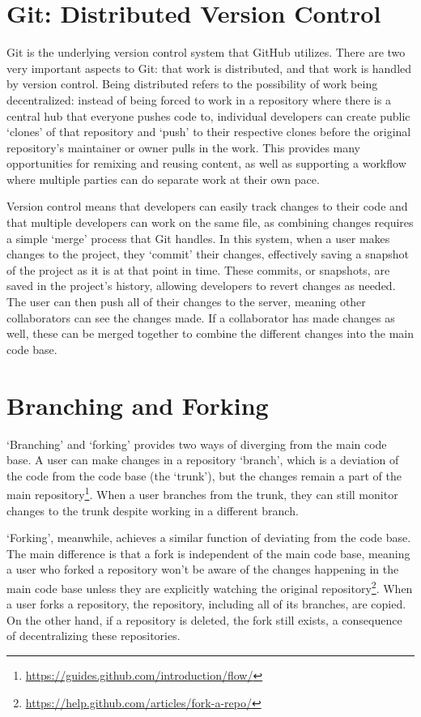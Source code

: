 \section{Git: Distributed Version Control}
Git is the underlying version control system that GitHub utilizes. There are two very important aspects to Git: that work is distributed, and that work is handled by version control. Being distributed refers to the possibility of work being decentralized: instead of being forced to work in a repository where there is a central hub that everyone pushes code to, individual developers can create public `clones' of that repository and `push' to their respective clones before the original repository's maintainer or owner pulls in the work. This provides many opportunities for remixing and reusing content, as well as supporting a workflow where multiple parties can do separate work at their own pace.

Version control means that developers can easily track changes to their code and that multiple developers can work on the same file, as combining changes requires a simple `merge' process that Git handles. In this system, when a user makes changes to the project, they `commit' their changes, effectively saving a snapshot of the project as it is at that point in time. These commits, or snapshots, are saved in the project's history, allowing developers to revert changes as needed. The user can then push all of their changes to the server, meaning other collaborators can see the changes made. If a collaborator has made changes as well, these can be merged together to combine the different changes into the main code base.

\section{Branching and Forking}
`Branching' and `forking' provides two ways of diverging from the main code base. A user can make changes in a repository `branch', which is a deviation of the code from the code base (the `trunk'), but the changes remain a part of the main repository\footnote{\url{https://guides.github.com/introduction/flow/}}. When a user branches from the trunk, they can still monitor changes to the trunk despite working in a different branch.

`Forking', meanwhile, achieves a similar function of deviating from the code base. The main difference is that a fork is independent of the main code base, meaning a user who forked a repository won't be aware of the changes happening in the main code base unless they are explicitly watching the original repository\footnote{\url{https://help.github.com/articles/fork-a-repo/}}. When a user forks a repository, the repository, including all of its branches, are copied. On the other hand, if a repository is deleted, the fork still exists, a consequence of decentralizing these repositories.

